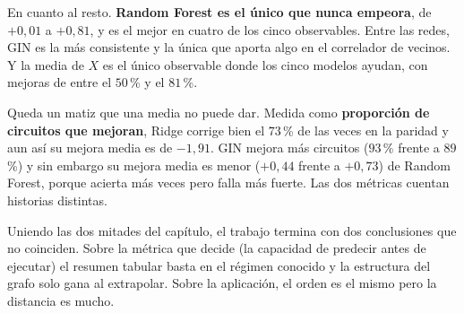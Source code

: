 En cuanto al resto. \textbf{Random Forest es el único que nunca empeora}, de $+0{,}01$ a
$+0{,}81$, y es el mejor en cuatro de los cinco observables. Entre las redes, GIN es la más
consistente y la única que aporta algo en el correlador de vecinos. Y la media de $X$ es el
único observable donde los cinco modelos ayudan, con mejoras de entre el $50$\,\% y el
$81$\,\%.

Queda un matiz que una media no puede dar. Medida como \textbf{proporción de circuitos que
mejoran}, Ridge corrige bien el $73$\,\% de las veces en la paridad y aun así su mejora media
es de $-1{,}91$. GIN mejora más circuitos ($93$\,\% frente a $89$\,\%) y sin
embargo su mejora media es menor ($+0{,}44$ frente a $+0{,}73$) de Random Forest, porque acierta más veces pero
falla más fuerte. Las dos métricas cuentan historias distintas.


Uniendo las dos mitades del capítulo, el trabajo termina con dos conclusiones que no coinciden.
Sobre la métrica que decide (la capacidad de predecir antes de ejecutar) el resumen tabular
basta en el régimen conocido y la estructura del grafo solo gana al extrapolar. Sobre la
aplicación, el orden es el mismo pero la distancia es mucho.
